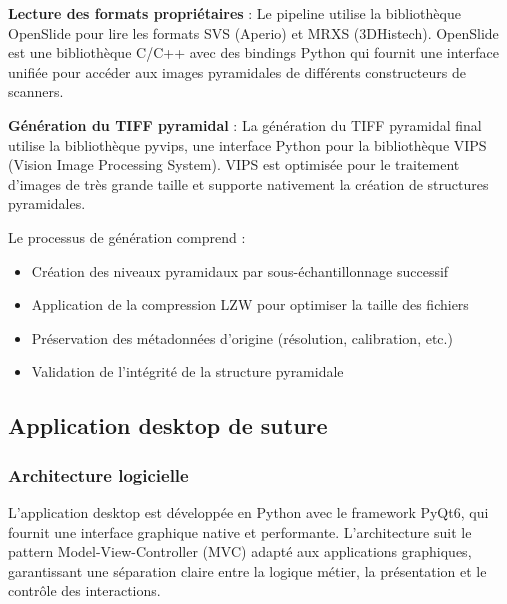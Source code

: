 \documentclass[12pt,a4paper]{report}
\begin{document}
\begin{}
\begin{}
\begin{}
\textbf{Lecture des formats propriétaires} : Le pipeline utilise la bibliothèque OpenSlide pour lire les formats SVS (Aperio) et MRXS (3DHistech). OpenSlide est une bibliothèque C/C++ avec des bindings Python qui fournit une interface unifiée pour accéder aux images pyramidales de différents constructeurs de scanners.

\textbf{Génération du TIFF pyramidal} : La génération du TIFF pyramidal final utilise la bibliothèque pyvips, une interface Python pour la bibliothèque VIPS (Vision Image Processing System). VIPS est optimisée pour le traitement d'images de très grande taille et supporte nativement la création de structures pyramidales.

Le processus de génération comprend :
\begin{itemize}
\item Création des niveaux pyramidaux par sous-échantillonnage successif
\item Application de la compression LZW pour optimiser la taille des fichiers
\item Préservation des métadonnées d'origine (résolution, calibration, etc.)
\item Validation de l'intégrité de la structure pyramidale
\end{itemize}

\subsection{Application desktop de suture}

\subsubsection{Architecture logicielle}

L'application desktop est développée en Python avec le framework PyQt6, qui fournit une interface graphique native et performante. L'architecture suit le pattern Model-View-Controller (MVC) adapté aux applications graphiques, garantissant une séparation claire entre la logique métier, la présentation et le contrôle des interactions.

\begin{figure}[H]
\centering
{}
\end{figure}
\end{}
\end{}
\end{}
\end{document}
